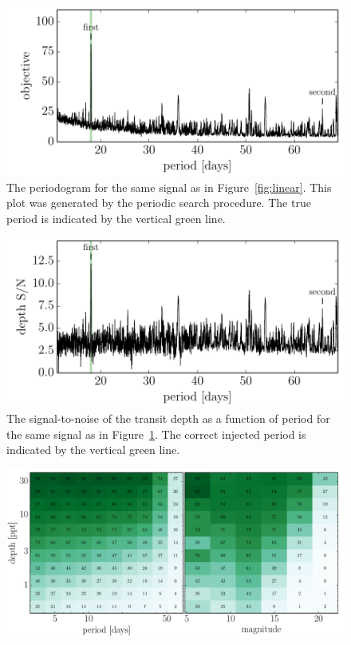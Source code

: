 \documentclass[12pt,preprint]{aastex}
\newcommand{\figref}[1]{\ref{fig:#1}}
\newcommand{\Fig}[1]{Figure~\figref{#1}}
\newcommand{\fig}[1]{\Fig{#1}}
\newcommand{\figlabel}[1]{\label{fig:#1}}
\begin{document}
\begin{figure}[p]
\begin{center}
\includegraphics{figures/periodic.pdf}
\end{center}
\caption{%
The periodogram for the same signal as in \fig{linear}.
This plot was generated by the periodic search procedure.
The true period is indicated by the vertical green line.
\figlabel{periodic}}
\end{figure}

\begin{figure}[p]
\begin{center}
\includegraphics{figures/depth_s2n.pdf}
\end{center}
\caption{%
The signal-to-noise of the transit depth as a function of period for the same
signal as in \fig{periodic}.
The correct injected period is indicated by the vertical green line.
\figlabel{depth-s2n}}
\end{figure}

\begin{figure}[p]
\begin{center}
\includegraphics[width=\textwidth]{figures/completeness.pdf}
\end{center}
\caption{%
\figlabel{completeness}}
\end{figure}
\end{document}
